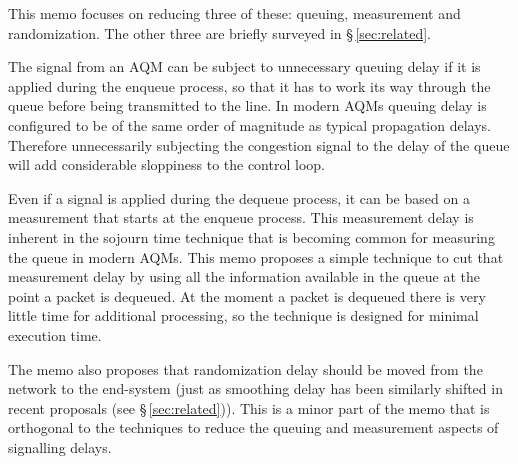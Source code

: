 This memo focuses on reducing three of these: queuing, measurement and randomization. The other three are briefly surveyed in \S\,\ref{sec:related}.

The signal from an AQM can be subject to unnecessary queuing delay if it is applied during the enqueue process, so that it has to work its way through the queue before being transmitted to the line. In modern AQMs queuing delay is configured to be of the same order of magnitude as typical propagation delays. Therefore unnecessarily subjecting the congestion signal to the delay of the queue will add considerable sloppiness to the control loop.

Even if a signal is applied during the dequeue process, it can be based on a measurement that starts at the enqueue process. This measurement delay is inherent in the sojourn time technique that is becoming common for measuring the queue in modern AQMs. This memo proposes a simple technique to cut that measurement delay by using all the information available in the queue at the point a packet is dequeued. At the moment a packet is dequeued there is very little time for additional processing, so the technique is designed for minimal execution time.

The memo also proposes that randomization delay should be moved from the network to the end-system (just as smoothing delay has been similarly shifted in recent proposals (see \S\,\ref{sec:related})). This is a minor part of the memo that is orthogonal to the techniques to reduce the queuing and measurement aspects of signalling delays. 



